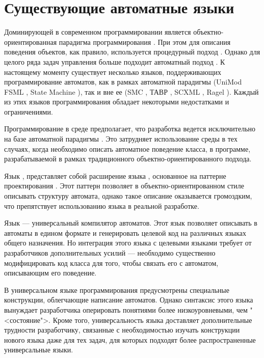 \section{Существующие автоматные языки}
Доминирующей в современном программировании является объектно-ориентированная парадигма программирования \cite{meyer}. При
этом для описания поведения объектов, как правило, используется процедурный подход \cite{nepeyvoda}. Однако для целого ряда
задач управления больше подходит автоматный подход \cite{shalyto01,shalyto02}. К настоящему моменту существует несколько
языков, поддерживающих программирование автоматов, как в рамках автоматной парадигмы (UniMod FSML \cite{lagunov}, State
Machine \cite{shamgunov}), так и вне ее (SMC \cite{smc}, ТАВР \cite{tsimbaluk}, SCXML \cite{scxml}, Ragel \cite{ragel}).
Каждый из этих языков программирования обладает некоторыми недостатками и ограничениями.

Программирование в среде  предполагает, что разработка ведется исключительно на базе автоматной парадигмы
\cite{myUMLSwitchEclipse}. Это затрудняет использование среды  в тех случаях, когда необходимо описать автоматное
поведение класса, в программе, разрабатываемой в рамках традиционного объектно-ориентированного подхода.

Язык , представляет собой расширение языка , основанное на паттерне проектирования 
 \cite{gof}. Этот паттерн позволяет в объектно-ориентированном стиле описывать структуру автомата, однако
такое описание оказывается громоздким, что препятствует использованию языка  в реальной разработке.

Язык  --- универсальный компилятор автоматов. Этот язык позволяет описывать в автоматы в едином формате и
генерировать целевой код на различных языках общего назначения. Но интеграция этого языка с целевыми языками требует от
разработчиков дополнительных усилий --- необходимо существенно модифицировать код класса для того, чтобы связать его с
автоматом, описывающим его поведение.

В универсальном языке программирования  предусмотрены специальные конструкции, облегчающие написание автоматов.
Однако синтаксис этого языка вынуждает разработчика оперировать понятиями более низкоуровневыми, чем "<состояние">. Кроме
того, универсальность языка  доставляет дополнительные трудности разработчику, связанные с необходимостью изучать
конструкции нового языка даже для тех задач, для которых подходят более распространенные универсальные языки.

